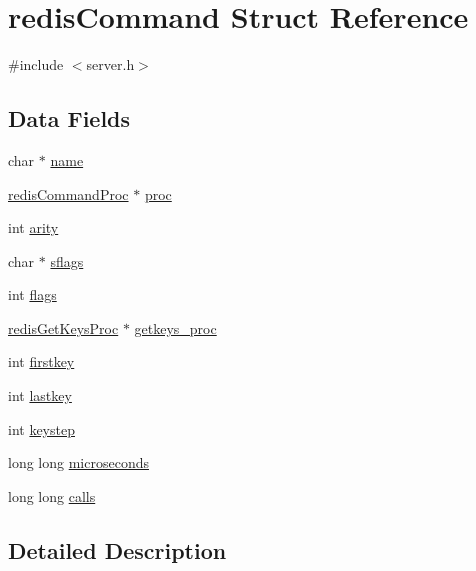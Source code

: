 \hypertarget{structredis_command}{}\section{redis\+Command Struct Reference}
\label{structredis_command}


{\ttfamily \#include $<$server.\+h$>$}

\subsection*{Data Fields}
\begin{DoxyCompactItemize}
\item 
char $\ast$ \hyperlink{structredis_command_a5ac083a645d964373f022d03df4849c8}{name}
\item 
\hyperlink{server_8h_a1b31bc58ae4df59cf0b0506c925d342e}{redis\+Command\+Proc} $\ast$ \hyperlink{structredis_command_a90feddf92dfbfdf42f3a4165c996f6f0}{proc}
\item 
int \hyperlink{structredis_command_a2e1dc7313b72e22a19179823661deb69}{arity}
\item 
char $\ast$ \hyperlink{structredis_command_abb4214e4b2dadd9f73384b61c6f13bee}{sflags}
\item 
int \hyperlink{structredis_command_ac8bf36fe0577cba66bccda3a6f7e80a4}{flags}
\item 
\hyperlink{server_8h_a90922bb810ab1c2d91ef0f2b47012bd8}{redis\+Get\+Keys\+Proc} $\ast$ \hyperlink{structredis_command_a871d4aede11ef92c86b3c64c2a5477c0}{getkeys\+\_\+proc}
\item 
int \hyperlink{structredis_command_aeb16776f95a4f73f9c6768fbbec9a038}{firstkey}
\item 
int \hyperlink{structredis_command_a908850c7f5d5cd51f3287973a5c385a5}{lastkey}
\item 
int \hyperlink{structredis_command_ac9fe07eb07b7322aa691ae2fca8f0875}{keystep}
\item 
long long \hyperlink{structredis_command_a89a6c4af7ebda470a83c3b01d01dcb14}{microseconds}
\item 
long long \hyperlink{structredis_command_af326e6907d82b48a7952eb2d099ac2f4}{calls}
\end{DoxyCompactItemize}


\subsection{Detailed Description}



